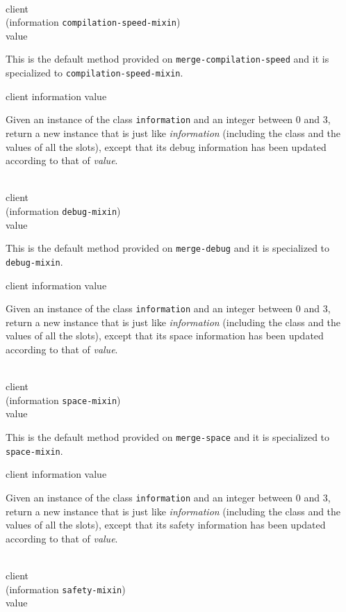 \\
           {client\\
            (information {\tt compilation-speed-mixin})\\
            value}

This is the default method provided on
\texttt{merge-compilation-speed} and it is specialized to
\texttt{compilation-speed-mixin}.

 {client information value}

Given an instance of the class \texttt{information} and an
integer between $0$ and $3$, return a new instance that is just like
\textit{information} (including the class and the values of
all the slots), except that its debug information has been updated
according to that of \textit{value}.

\\
           {client\\
            (information {\tt debug-mixin})\\
            value}

This is the default method provided on \texttt{merge-debug} and it is
specialized to \texttt{debug-mixin}.

 {client information value}

Given an instance of the class \texttt{information} and an
integer between $0$ and $3$, return a new instance that is just like
\textit{information} (including the class and the values of
all the slots), except that its space information has been updated
according to that of \textit{value}.

\\
           {client\\
            (information {\tt space-mixin})\\
            value}

This is the default method provided on \texttt{merge-space} and it is
specialized to \texttt{space-mixin}.

 {client information value}

Given an instance of the class \texttt{information} and an
integer between $0$ and $3$, return a new instance that is just like
\textit{information} (including the class and the values of
all the slots), except that its safety information has been updated
according to that of \textit{value}.

\\
           {client\\
            (information {\tt safety-mixin})\\
            value}

